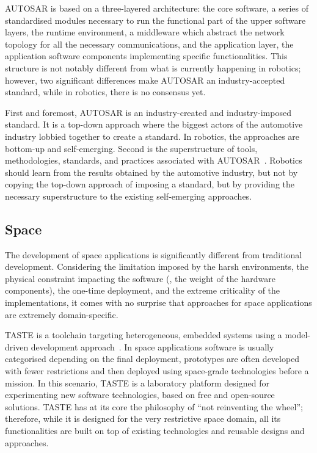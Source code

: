 AUTOSAR is based on a three-layered architecture: the core software, a series of standardised modules necessary to run the functional part of the upper software layers, the runtime environment, a middleware which abstract the network topology for all the necessary communications, and the application layer, the application software components implementing specific functionalities. This structure is not notably different from what is currently happening in robotics; however, two significant differences make AUTOSAR an industry-accepted standard, while in robotics, there is no consensus yet.

First and foremost, AUTOSAR is an industry-created and in\-dus\-try-imposed standard. It is a top-down approach where the biggest actors of the automotive industry lobbied together to create a standard. In robotics, the approaches are bottom-up and self-emerging. Second is the superstructure of tools, methodologies, standards, and practices associated with AUTOSAR~\cite{arts2015testing, anssi2011enabling, giese2010model}. Robotics should learn from the results obtained by the automotive industry, but not by copying the top-down approach of imposing a standard, but by providing the necessary superstructure to the existing self-emerging approaches.

\subsection{Space}
The development of space applications is significantly different from traditional development. Considering the limitation imposed by the harsh environments, the physical constraint impacting the software (\eg, the weight of the hardware components), the one-time deployment, and the extreme criticality of the implementations, it comes with no surprise that approaches for space applications are extremely domain-specific.

TASTE is a toolchain targeting heterogeneous, embedded systems using a model-driven development approach~\cite{perrotin2010taste}. In space applications software is usually categorised depending on the final deployment, prototypes are often developed with fewer restrictions and then deployed using space-grade technologies before a mission. In this scenario, TASTE is a laboratory platform designed for experimenting new software technologies, based on free and open-source solutions. TASTE has at its core the philosophy of ``not reinventing the wheel''; therefore, while it is designed for the very restrictive space domain, all its functionalities are built on top of existing technologies and reusable designs and approaches.

